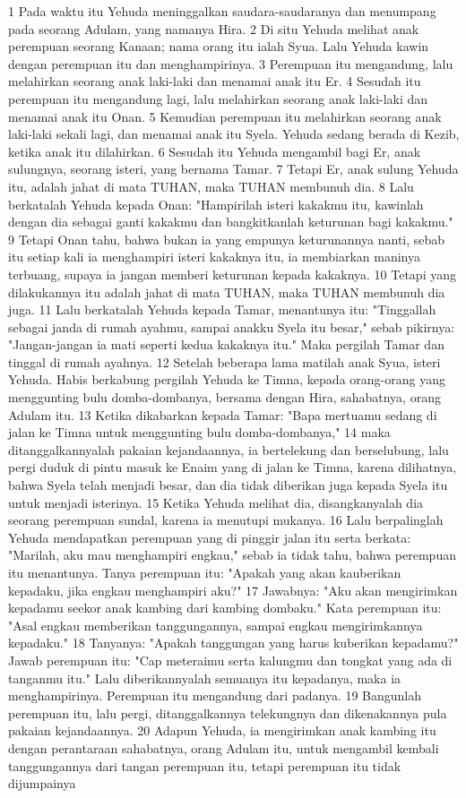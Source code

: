 \begin{biblechapter} %
1 Pada waktu itu Yehuda meninggalkan saudara-saudaranya dan menumpang pada seorang Adulam, yang namanya Hira. 2 Di situ Yehuda melihat anak perempuan seorang Kanaan; nama orang itu ialah Syua. Lalu Yehuda kawin dengan perempuan itu dan menghampirinya. 3 Perempuan itu mengandung, lalu melahirkan seorang anak laki-laki dan menamai anak itu Er. 4 Sesudah itu perempuan itu mengandung lagi, lalu melahirkan seorang anak laki-laki dan menamai anak itu Onan. 5 Kemudian perempuan itu melahirkan seorang anak laki-laki sekali lagi, dan menamai anak itu Syela. Yehuda sedang berada di Kezib, ketika anak itu dilahirkan. 6 Sesudah itu Yehuda mengambil bagi Er, anak sulungnya, seorang isteri, yang bernama Tamar. 7 Tetapi Er, anak sulung Yehuda itu, adalah jahat di mata TUHAN, maka TUHAN membunuh dia. 8 Lalu berkatalah Yehuda kepada Onan: "Hampirilah isteri kakakmu itu, kawinlah dengan dia sebagai ganti kakakmu dan bangkitkanlah keturunan bagi kakakmu." 9 Tetapi Onan tahu, bahwa bukan ia yang empunya keturunannya nanti, sebab itu setiap kali ia menghampiri isteri kakaknya itu, ia membiarkan maninya terbuang, supaya ia jangan memberi keturunan kepada kakaknya. 10 Tetapi yang dilakukannya itu adalah jahat di mata TUHAN, maka TUHAN membunuh dia juga. 11 Lalu berkatalah Yehuda kepada Tamar, menantunya itu: "Tinggallah sebagai janda di rumah ayahmu, sampai anakku Syela itu besar," sebab pikirnya: "Jangan-jangan ia mati seperti kedua kakaknya itu." Maka pergilah Tamar dan tinggal di rumah ayahnya. 12 Setelah beberapa lama matilah anak Syua, isteri Yehuda. Habis berkabung pergilah Yehuda ke Timna, kepada orang-orang yang menggunting bulu domba-dombanya, bersama dengan Hira, sahabatnya, orang Adulam itu. 13 Ketika dikabarkan kepada Tamar: "Bapa mertuamu sedang di jalan ke Timna untuk menggunting bulu domba-dombanya," 14 maka ditanggalkannyalah pakaian kejandaannya, ia bertelekung dan berselubung, lalu pergi duduk di pintu masuk ke Enaim yang di jalan ke Timna, karena dilihatnya, bahwa Syela telah menjadi besar, dan dia tidak diberikan juga kepada Syela itu untuk menjadi isterinya. 15 Ketika Yehuda melihat dia, disangkanyalah dia seorang perempuan sundal, karena ia menutupi mukanya. 16 Lalu berpalinglah Yehuda mendapatkan perempuan yang di pinggir jalan itu serta berkata: "Marilah, aku mau menghampiri engkau," sebab ia tidak tahu, bahwa perempuan itu menantunya. Tanya perempuan itu: "Apakah yang akan kauberikan kepadaku, jika engkau menghampiri aku?" 17 Jawabnya: "Aku akan mengirimkan kepadamu seekor anak kambing dari kambing dombaku." Kata perempuan itu: "Asal engkau memberikan tanggungannya, sampai engkau mengirimkannya kepadaku." 18 Tanyanya: "Apakah tanggungan yang harus kuberikan kepadamu?" Jawab perempuan itu: "Cap meteraimu serta kalungmu dan tongkat yang ada di tanganmu itu." Lalu diberikannyalah semuanya itu kepadanya, maka ia menghampirinya. Perempuan itu mengandung dari padanya. 19 Bangunlah perempuan itu, lalu pergi, ditanggalkannya telekungnya dan dikenakannya pula pakaian kejandaannya. 20 Adapun Yehuda, ia mengirimkan anak kambing itu dengan perantaraan sahabatnya, orang Adulam itu, untuk mengambil kembali tanggungannya dari tangan perempuan itu, tetapi perempuan itu tidak dijumpainya 
\end{biblechapter}
